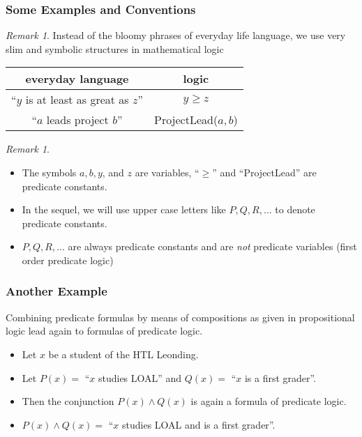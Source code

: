\documentclass{beamer}
\theoremstyle{remark}
\newtheorem{remark}[theorem]{Remark}
\begin{document}
\begin{frame}
\frametitle{Some Examples and Conventions}
\begin{remark}
Instead of the bloomy phrases of everyday life language, we use very slim and symbolic structures in mathematical logic
\end{remark}
\pause
\begin{example}
\begin{tabular}{|c|c|}
\hline
everyday language & logic \\ \hline
``$y$ is at least as great as $z$'' & $y \geq z$ \\
``$a$ leads project $b$'' & ProjectLead($a, b$) \\ \hline
 \end{tabular}
\end{example}
 \pause
\begin{remark}
\begin{itemize}
	\item The symbols $a, b, y$, and $z$ are variables, ``$\geq$'' and ``ProjectLead'' are predicate constants.
	\pause
	\item In the sequel, we will use upper case letters like $P, Q, R, \ldots$ to denote predicate constants.
	\pause
	\item $P, Q, R, \ldots$ are always predicate constants and are {\em not} predicate variables (first order predicate logic)
\end{itemize}
\end{remark}
\end{frame}

\begin{frame}
\frametitle{Another Example}
Combining predicate formulas by means of compositions as given in propositional logic lead again to formulas of predicate logic.
\pause
\begin{example}
\begin{itemize}
	\item Let $x$ be a student of the HTL Leonding.
	\pause
	\item Let $P(x) = $ ``$x$ studies LOAL'' and $Q(x) = $ ``$x$ is a first grader''.
	\pause
	\item Then the conjunction $P(x) \land Q(x)$ is again a formula of predicate logic.
	\pause
	\item $P(x) \land Q(x) = $ ``$x$ studies LOAL and is a first grader''.
\end{itemize}

\end{example}
\end{frame}
\end{document}
